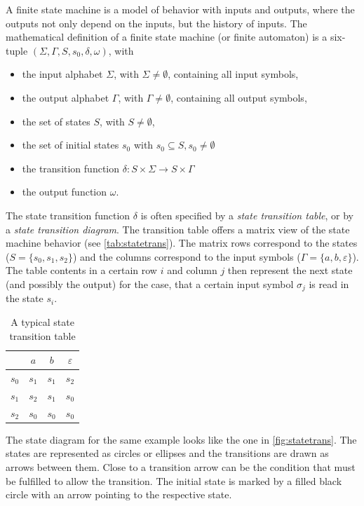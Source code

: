 \documentclass[a4paper,12pt,BCOR=6mm,bibtotoc,idxtotoc]{scrbook}
\begin{document}
A finite state machine \cite{automata} is a model of behavior with
inputs and outputs, where the outputs not only depend on the inputs,
but the history of inputs. The mathematical definition of a finite
state machine (or finite automaton) is a six-tuple $(\Sigma, \Gamma,
S, s_0, \delta, \omega)$, with

\begin{itemize}
\item the input alphabet $\Sigma$, with $\Sigma \neq
  \emptyset$, containing all input symbols,
\item the output alphabet $\Gamma$, with $\Gamma \neq
  \emptyset$, containing all output symbols,
\item the set of states $S$, with $S \neq \emptyset$,
\item the set of initial states $s_0$ with $s_0 \subseteq S, s_0 \neq
  \emptyset$
\item the transition function $\delta: S \times \Sigma \rightarrow S
  \times \Gamma$
\item the output function $\omega$.
\end{itemize}

The state transition function $\delta$ is often specified by a
\textit{state transition table}, or by a \textit{state transition
  diagram}. The transition table offers a matrix view of the state
machine behavior (see \autoref{tab:statetrans}). The matrix rows
correspond to the states ($S = \{s_0, s_1, s_2\}$) and the columns
correspond to the input symbols ($\Gamma = \{a, b, \varepsilon\}$).
The table contents in a certain row $i$ and column $j$ then represent
the next state (and possibly the output) for the case, that a certain
input symbol $\sigma_j$ is read in the state $s_i$.

\begin{table}[htbp]
  \caption{A typical state transition table}
  \label{tab:statetrans}
  \vspace{2mm}
  \centering
  \begin{tabular}{l|ccc}
    & $a$ & $b$ & $\varepsilon$\\ \hline
    $s_0$ & $s_1$ & $s_1$ & $s_2$\\
    $s_1$ & $s_2$ & $s_1$ & $s_0$\\
    $s_2$ & $s_0$ & $s_0$ & $s_0$\\ \hline
  \end{tabular}
\end{table}

The state diagram for the same example looks like the one in
\autoref{fig:statetrans}. The states are represented as circles or
ellipses and the transitions are drawn as arrows between them. Close
to a transition arrow can be the condition that must be fulfilled to
allow the transition. The initial state is marked by a filled black
circle with an arrow pointing to the respective state.
\end{document}
